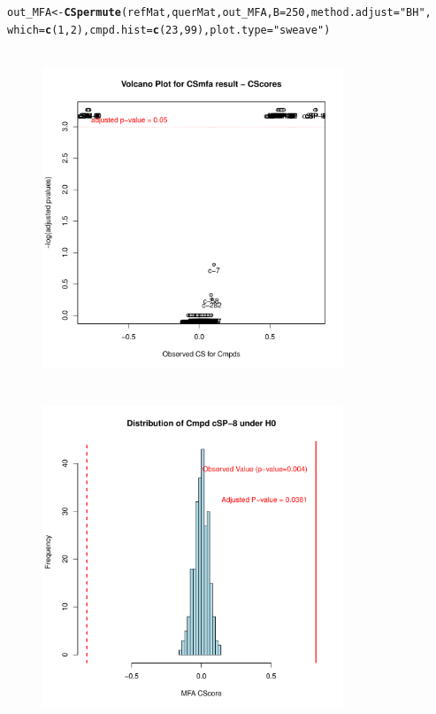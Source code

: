 \documentclass[a4paper]{article}\usepackage[]{graphicx}\usepackage[]{color}
\makeatletter
\newcommand{\hlnum}[1]{\textcolor[rgb]{0.686,0.059,0.569}{#1}}%
\newcommand{\hlstr}[1]{\textcolor[rgb]{0.192,0.494,0.8}{#1}}%
\newcommand{\hlstd}[1]{\textcolor[rgb]{0.345,0.345,0.345}{#1}}%
\newcommand{\hlkwb}[1]{\textcolor[rgb]{0.69,0.353,0.396}{#1}}%
\newcommand{\hlkwc}[1]{\textcolor[rgb]{0.333,0.667,0.333}{#1}}%
\newcommand{\hlkwd}[1]{\textcolor[rgb]{0.737,0.353,0.396}{\textbf{#1}}}%
\newenvironment{kframe}{%
 \def\at@end@of@kframe{}%
 \ifinner\ifhmode%
  \def\at@end@of@kframe{\end{minipage}}%
  \begin{minipage}{\columnwidth}%
 \fi\fi%
 \def\FrameCommand##1{\hskip\@totalleftmargin \hskip-\fboxsep
 \colorbox{shadecolor}{##1}\hskip-\fboxsep
     \hskip-\linewidth \hskip-\@totalleftmargin \hskip\columnwidth}%
 \MakeFramed {\advance\hsize-\width
   \@totalleftmargin\z@ \linewidth\hsize
   \@setminipage}}%
 {\par\unskip\endMakeFramed%
 \at@end@of@kframe}
\newenvironment{knitrout}{}{} %
\makeatother
\begin{document}
\begin{knitrout}
\color{fgcolor}\begin{kframe}
\begin{alltt}
\hlstd{out_MFA} \hlkwb{<-} \hlkwd{CSpermute}\hlstd{(refMat,querMat,out_MFA,}\hlkwc{B}\hlstd{=}\hlnum{250}\hlstd{,}\hlkwc{method.adjust}\hlstd{=}\hlstr{"BH"}\hlstd{,}
                \hlkwc{which}\hlstd{=}\hlkwd{c}\hlstd{(}\hlnum{1}\hlstd{,}\hlnum{2}\hlstd{),}\hlkwc{cmpd.hist}\hlstd{=}\hlkwd{c}\hlstd{(}\hlnum{23}\hlstd{,}\hlnum{99}\hlstd{),}\hlkwc{plot.type}\hlstd{=}\hlstr{"sweave"}\hlstd{)}
\end{alltt}
\end{kframe}\begin{figure}[H]

\includegraphics[width=9cm,height=10cm]{figure/CSpermuteplots-1} 
\includegraphics[width=9cm,height=10cm]{figure/CSpermuteplots-2} 

\end{figure}
\end{knitrout}
\end{document}
